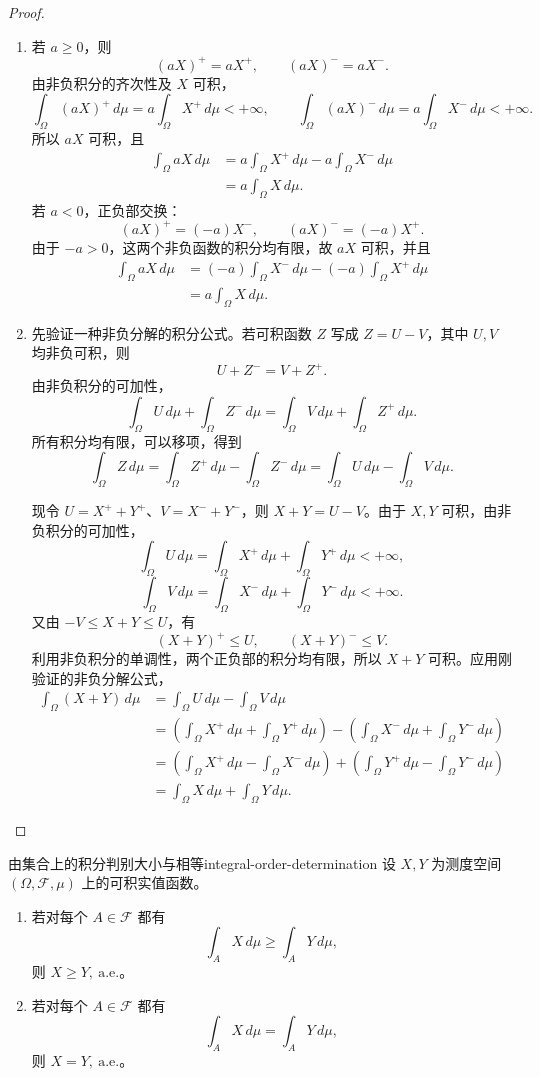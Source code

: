 \begin{proof}
\begin{enumerate}
\item 若 $a\geq0$，则
\[
(aX)^+=aX^+,\qquad (aX)^-=aX^-.
\]
由非负积分的齐次性及 $X$ 可积，
\[
\int_\Omega(aX)^+\,d\mu=a\int_\Omega X^+\,d\mu<+\infty,\qquad
\int_\Omega(aX)^-\,d\mu=a\int_\Omega X^-\,d\mu<+\infty.
\]
所以 $aX$ 可积，且
\begin{align*}
\int_\Omega aX\,d\mu
&=a\int_\Omega X^+\,d\mu-a\int_\Omega X^-\,d\mu\\
&=a\int_\Omega X\,d\mu.
\end{align*}
若 $a<0$，正负部交换：
\[
(aX)^+=(-a)X^-,\qquad (aX)^-=(-a)X^+.
\]
由于 $-a>0$，这两个非负函数的积分均有限，故 $aX$ 可积，并且
\begin{align*}
\int_\Omega aX\,d\mu
&=(-a)\int_\Omega X^-\,d\mu-(-a)\int_\Omega X^+\,d\mu\\
&=a\int_\Omega X\,d\mu.
\end{align*}
\item 先验证一种非负分解的积分公式。若可积函数 $Z$ 写成 $Z=U-V$，其中 $U,V$ 均非负可积，则
\[
U+Z^-=V+Z^+.
\]
由非负积分的可加性，
\[
\int_\Omega U\,d\mu+\int_\Omega Z^-\,d\mu
=\int_\Omega V\,d\mu+\int_\Omega Z^+\,d\mu.
\]
所有积分均有限，可以移项，得到
\[
\int_\Omega Z\,d\mu
=\int_\Omega Z^+\,d\mu-\int_\Omega Z^-\,d\mu
=\int_\Omega U\,d\mu-\int_\Omega V\,d\mu.
\]

现令 $U=X^++Y^+$、$V=X^-+Y^-$，则 $X+Y=U-V$。由于 $X,Y$ 可积，由非负积分的可加性，
\[
\int_\Omega U\,d\mu
=\int_\Omega X^+\,d\mu+\int_\Omega Y^+\,d\mu<+\infty,
\]
\[
\int_\Omega V\,d\mu
=\int_\Omega X^-\,d\mu+\int_\Omega Y^-\,d\mu<+\infty.
\]
又由 $-V\leq X+Y\leq U$，有
\[
(X+Y)^+\leq U,\qquad (X+Y)^-\leq V.
\]
利用非负积分的单调性，两个正负部的积分均有限，所以 $X+Y$ 可积。应用刚验证的非负分解公式，
\begin{align*}
\int_\Omega(X+Y)\,d\mu
&=\int_\Omega U\,d\mu-\int_\Omega V\,d\mu\\
&=\left(\int_\Omega X^+\,d\mu+\int_\Omega Y^+\,d\mu\right)
 -\left(\int_\Omega X^-\,d\mu+\int_\Omega Y^-\,d\mu\right)\\
&=\left(\int_\Omega X^+\,d\mu-\int_\Omega X^-\,d\mu\right)
 +\left(\int_\Omega Y^+\,d\mu-\int_\Omega Y^-\,d\mu\right)\\
&=\int_\Omega X\,d\mu+\int_\Omega Y\,d\mu.
\end{align*}
\end{enumerate}
\end{proof}

\begin{mytheorem}{由集合上的积分判别大小与相等}{integral-order-determination}
设 $X,Y$ 为测度空间 $(\Omega,\mathcal F,\mu)$ 上的可积实值函数。
\begin{enumerate}
\item 若对每个 $A\in\mathcal F$ 都有
\[
\int_A X\,d\mu\geq\int_A Y\,d\mu,
\]
则 $X\geq Y,\ \mathrm{a.e.}$。
\item 若对每个 $A\in\mathcal F$ 都有
\[
\int_A X\,d\mu=\int_A Y\,d\mu,
\]
则 $X=Y,\ \mathrm{a.e.}$。
\end{enumerate}
\end{mytheorem}

